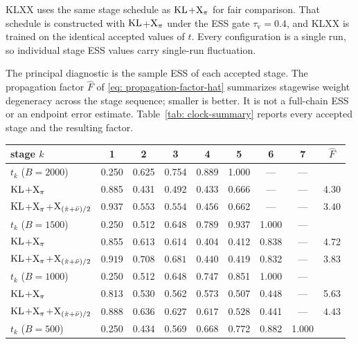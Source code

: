 \documentclass{article}
\begin{document}
KLXX uses the same stage schedule as $\mathrm{KL}$+$\mathrm{X}_\pi$ for fair comparison. That schedule is constructed with $\mathrm{KL}$+$\mathrm{X}_\pi$ under the ESS gate $\tau_{\mathrm v}=0.4$, and KLXX is trained on the identical accepted values of $t$. Every configuration is a single run, so individual stage ESS values carry single-run fluctuation.

The principal diagnostic is the sample ESS of each accepted stage. The propagation factor $\hat F$ of \eqref{eq: propagation-factor-hat} summarizes stagewise weight degeneracy across the stage sequence; smaller is better. It is not a full-chain ESS or an endpoint error estimate. Table~\ref{tab: clock-summary} reports every accepted stage and the resulting factor.

\begin{table}[htb]
    \centering
    \begin{tabular}{lcccccccc}
        \toprule
        stage $k$ & 1 & 2 & 3 & 4 & 5 & 6 & 7 & $\hat F$ \\
        \midrule
        $t_k$ ($B=2000$) & 0.250 & 0.625 & 0.754 & 0.889 & 1.000 & --- & --- & \\
        $\mathrm{KL}$+$\mathrm{X}_\pi$ & 0.885 & 0.431 & 0.492 & 0.433 & $\mathbf{0.666}$ & --- & --- & 4.30 \\
        $\mathrm{KL}$+$\mathrm{X}_\pi$+$\mathrm{X}_{(\hat\pi+\bar\nu)/2}$ & $\mathbf{0.937}$ & $\mathbf{0.553}$ & $\mathbf{0.554}$ & $\mathbf{0.456}$ & 0.662 & --- & --- & $\mathbf{3.40}$ \\
        \midrule
        $t_k$ ($B=1500$) & 0.250 & 0.512 & 0.648 & 0.789 & 0.937 & 1.000 & --- & \\
        $\mathrm{KL}$+$\mathrm{X}_\pi$ & 0.855 & 0.613 & 0.614 & 0.404 & 0.412 & $\mathbf{0.838}$ & --- & 4.72 \\
        $\mathrm{KL}$+$\mathrm{X}_\pi$+$\mathrm{X}_{(\hat\pi+\bar\nu)/2}$ & $\mathbf{0.919}$ & $\mathbf{0.708}$ & $\mathbf{0.681}$ & $\mathbf{0.440}$ & $\mathbf{0.419}$ & 0.832 & --- & $\mathbf{3.83}$ \\
        \midrule
        $t_k$ ($B=1000$) & 0.250 & 0.512 & 0.648 & 0.747 & 0.851 & 1.000 & --- & \\
        $\mathrm{KL}$+$\mathrm{X}_\pi$ & 0.813 & 0.530 & 0.562 & 0.573 & 0.507 & $\mathbf{0.448}$ & --- & 5.63 \\
        $\mathrm{KL}$+$\mathrm{X}_\pi$+$\mathrm{X}_{(\hat\pi+\bar\nu)/2}$ & $\mathbf{0.888}$ & $\mathbf{0.636}$ & $\mathbf{0.627}$ & $\mathbf{0.617}$ & $\mathbf{0.528}$ & 0.441 & --- & $\mathbf{4.43}$ \\
        \midrule
        $t_k$ ($B=500$) & 0.250 & 0.434 & 0.569 & 0.668 & 0.772 & 0.882 & 1.000 & \\

\end{tabular}
\end{table}
\end{document}
